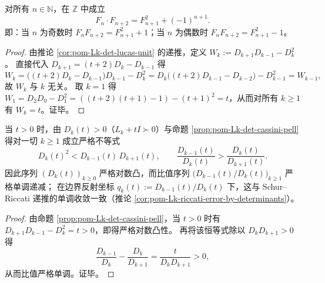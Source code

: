 \begin{proposition}\label{prop:pom-fib-cassini-unified}
对所有 \(n \in \mathbb{N}\)，在 \(\mathbb{Z}\) 中成立
\[
F_n \cdot F_{n+2} = F_{n+1}^2 + (-1)^{n+1}.
\]
即：当 \(n\) 为奇数时 \(F_n F_{n+2} = F_{n+1}^2 + 1\)；当 \(n\) 为偶数时 \(F_n F_{n+2} = F_{n+1}^2 - 1\)。
\end{proposition}

\begin{proof}
由推论 \ref{cor:pom-Lk-det-lucas-unit} 的递推，定义
\(
W_k:=D_{k+1}D_{k-1}-D_k^2
\)。
直接代入 \(D_{k+1}=(t+2)D_k-D_{k-1}\) 得
\[
W_k=\bigl((t+2)D_k-D_{k-1}\bigr)D_{k-1}-D_k^2
=D_k\bigl((t+2)D_{k-1}-D_{k-2}\bigr)-D_{k-1}^2
=W_{k-1},
\]
故 \(W_k\) 与 \(k\) 无关。
取 \(k=1\) 得
\(
W_1=D_2D_0-D_1^2=((t+2)(t+1)-1)- (t+1)^2=t
\)，从而对所有 \(k\ge 1\) 有 \(W_k=t\)。证毕。
\end{proof}

\begin{corollary}\label{cor:pom-Lk-det-logconvex-ratio}
当 \(t>0\) 时，由 \(D_k(t)>0\)（\(L_k+tI\succ 0\)）与命题 \ref{prop:pom-Lk-det-cassini-pell} 得对一切 \(k\ge 1\) 成立严格不等式
\[
D_k(t)^2< D_{k-1}(t)\,D_{k+1}(t),
\qquad
\frac{D_{k-1}(t)}{D_k(t)}>\frac{D_k(t)}{D_{k+1}(t)}.
\]
因此序列 \((D_k(t))_{k\ge 0}\) 严格对数凸，而比值序列 \(\bigl(D_{k-1}(t)/D_k(t)\bigr)_{k\ge 1}\) 严格单调递减；
在边界反射坐标 \(q_k(t):=D_{k-1}(t)/D_k(t)\) 下，这与 Schur--Riccati 递推的单调收敛一致（推论 \ref{cor:pom-Lk-riccati-error-by-determinants}）。
\end{corollary}
\begin{proof}
由命题 \ref{prop:pom-Lk-det-cassini-pell}，当 \(t>0\) 时有 \(D_{k+1}D_{k-1}-D_k^2=t>0\)，即得严格对数凸性。
再将该恒等式除以 \(D_kD_{k+1}>0\) 得
\[
\frac{D_{k-1}}{D_k}-\frac{D_k}{D_{k+1}}=\frac{t}{D_kD_{k+1}}>0,
\]
从而比值严格单调。证毕。
\end{proof}
